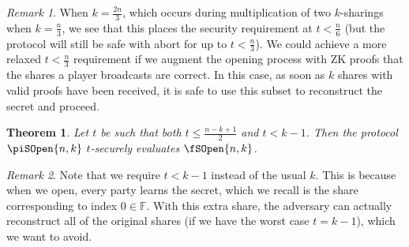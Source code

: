 \documentclass{article}
\newtheorem{theorem}{Theorem}
\theoremstyle{remark}
\newtheorem{remark}{Remark}
\newcommand{\F}{\mathbb{F}}
\begin{document}
\begin{remark}
	When $k = \frac{2n}{3}$, which occurs during multiplication of two
	$k$-sharings when $k = \frac{n}{3}$, we see that this places the security
	requirement at $t < \frac{n}{6}$ (but the protocol will still be safe with
	abort for up to $t < \frac{n}{3}$). We could achieve a more relaxed $t <
	\frac{n}{3}$ requirement if we augment the opening process with ZK proofs
	that the shares a player broadcasts are correct. In this case, as soon as
	$k$ shares with valid proofs have been received, it is safe to use this
	subset to reconstruct the secret and proceed.
\end{remark}

\begin{theorem}
	Let $t$ be such that both $t \le \frac{n - k + 1}{2}$ and $t < k - 1$. Then
	the protocol $\piSOpen{n,k}$ $t$-securely evaluates $\fSOpen{n,k}$.
\end{theorem}

\begin{remark}
	Note that we require $t < k - 1$ instead of the usual $k$. This is because
	when we open, every party learns the secret, which we recall is the share
	corresponding to index $0 \in \F$. With this extra share, the adversary can
	actually reconstruct all of the original shares (if we have the worst case
	$t = k - 1$), which we want to avoid.
\end{remark}
\end{document}
